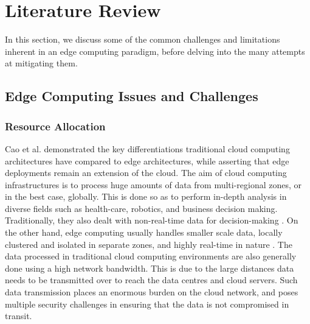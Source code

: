 \section{Literature Review}
\label{sec:ch2-lit-review}

In this section, we discuss some of the common challenges and limitations inherent in an edge computing paradigm, before delving into the many attempts at mitigating them.

\subsection{Edge Computing Issues and Challenges}
\label{subsec:edge-issues}

\subsubsection{Resource Allocation}
\label{subsubsec:edge-resource-alloc}

Cao et al. \cite{cao2020overview} demonstrated the key differentiations traditional cloud computing architectures have compared to edge architectures, while asserting that edge deployments remain an extension of the cloud. The aim of cloud computing infrastructures is to process huge amounts of data from multi-regional zones, or in the best case, globally. This is done so as to perform in-depth analysis in diverse fields such as health-care, robotics, and business decision making. Traditionally, they also dealt with non-real-time data for decision-making \cite{premsankar2018edge}. On the other hand, edge computing usually handles smaller scale data, locally clustered and isolated in separate zones, and highly real-time in nature \cite{mishra2020early}. The data processed in traditional cloud computing environments are also generally done using a high network bandwidth. This is due to the large distances data needs to be transmitted over to reach the data centres and cloud servers. Such data transmission places an enormous burden on the cloud network, and poses multiple security challenges in ensuring that the data is not compromised in transit.\par

